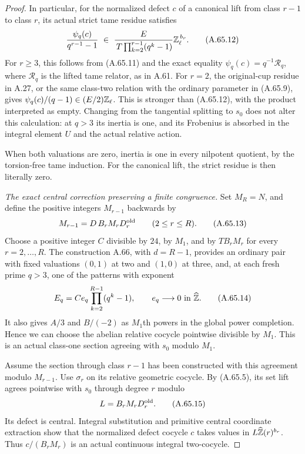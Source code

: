 \begin{proof}
In particular, for the normalized defect $c$ of a canonical lift from
class $r-1$ to class $r$, its actual strict tame residue satisfies
\[
 \frac{\psi_q(c)}{q^{r-1}-1}
       \ \in\
 \frac{E}{\,T\prod_{k=2}^{r-1}(q^k-1)}
          \mathbb Z_\ell^{\,b_r}.
 \tag{A.65.12}
\]
For $r\geq3$, this follows from (A.65.11) and the exact equality
$\psi_q(c)=q^{-1}\mathcal R_q$, where $\mathcal R_q$ is the lifted
tame relator, as in A.61.  For $r=2$, the original-cup residue in A.27,
or the same class-two relation with the ordinary parameter in
(A.65.9), gives $\psi_q(c)/(q-1)\in(E/2)\mathbb Z_\ell$.
This is stronger than (A.65.12), with the product interpreted as empty.
Changing from the tangential splitting to $s_0$ does not alter this
calculation: at $q>3$ its inertia is one, and its Frobenius is absorbed
in the integral element $U$ and the actual relative action.

When both valuations are zero, inertia is one in every nilpotent
quotient, by the torsion-free tame induction.  For the canonical lift,
the strict residue is then literally zero.

\emph{The exact central correction preserving a finite congruence.}
Set $M_R=N$, and define the positive integers $M_{r-1}$ backwards by
\[
 M_{r-1}=D\,B_r M_rD_r^{\rm old}\qquad(2\leq r\leq R).
 \tag{A.65.13}
\]
Choose a positive integer $C$ divisible by $24$, by $M_1$, and by
$T B_rM_r$ for every $r=2,\ldots,R$.
The construction A.66, with $d=R-1$, provides an ordinary pair with
fixed valuations $(0,1)$ at two and $(1,0)$ at three, and, at each
fresh prime $q>3$, one of the patterns with exponent
\[
 E_q=C e_q\prod_{k=2}^{R-1}(q^k-1),\qquad e_q\longrightarrow0
                                  \text{ in }\widehat{\mathbb Z}.
 \tag{A.65.14}
\]
It also gives $A/3$ and $B/(-2)$ as $M_1$th powers in the global power
completion.  Hence we can choose the abelian relative cocycle
pointwise divisible by $M_1$.  This is an actual class-one section
agreeing with $s_0$ modulo $M_1$.

Assume the section through class $r-1$ has been constructed with this
agreement modulo $M_{r-1}$.
Use $\sigma_r$ on its relative geometric cocycle.
By (A.65.5), its set lift agrees pointwise with $s_0$ through degree
$r$ modulo
\[
                   L=B_rM_rD_r^{\rm old}.
 \tag{A.65.15}
\]
Its defect is central.  Integral substitution and primitive central
coordinate extraction show that the normalized defect cocycle $c$
takes values in $L\widehat{\mathbb Z}(r)^{b_r}$.
Thus $c/(B_rM_r)$ is an actual continuous integral two-cocycle.


\end{proof}
